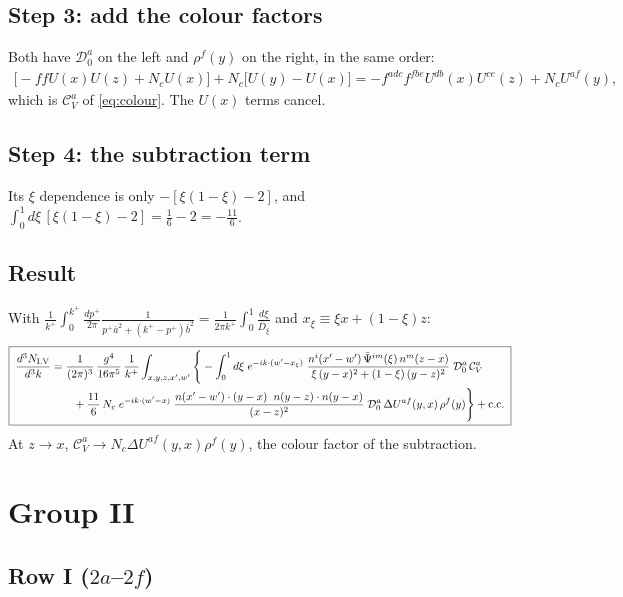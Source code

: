 \documentclass[10pt]{article}
\numberwithin{equation}{section}
\begin{document}
\subsection{Step 3: add the colour factors}
Both have $\mathcal{D}_{0}^{a}$ on the left and $\rho^{f}(y)$ on the right, in the same order:
\begin{align}
\big[-ffU(x)U(z)+N_{c}U(x)\big]+N_{c}\big[U(y)-U(x)\big]=-f^{adc}f^{fbe}U^{db}(x)U^{ce}(z)+N_{c}U^{af}(y),
\end{align}
which is $\mathcal{C}_{V}^{a}$ of \eqref{eq:colour}. The $U(x)$ terms cancel.

\subsection{Step 4: the subtraction term}
Its $\xi$ dependence is only $-[\xi(1-\xi)-2]$, and $\int_{0}^{1}d\xi\,[\xi(1-\xi)-2]=\tfrac16-2=-\tfrac{11}{6}$.

\subsection{Result}
With $\frac{1}{k^{+}}\int_{0}^{k^{+}}\frac{dp^{+}}{2\pi}\frac{1}{p^{+}\bar a^{2}+(k^{+}-p^{+})\bar b^{2}}=\frac{1}{2\pi k^{+}}\int_{0}^{1}\frac{d\xi}{\bar D_{\xi}}$ and $x_{\xi}\equiv\xi x+(1-\xi)z$:
\begin{align}
\boxed{\;\begin{aligned}
\frac{d^{3}N_{\rm I.V}}{d^{3}k}&=\frac{1}{(2\pi)^{3}}\,\frac{g^{4}}{16\pi^{5}}\,\frac{1}{k^{+}}\int_{x,y,z,x',w'}\Bigg\{-\int_{0}^{1}d\xi\;e^{-ik\cdot(w'-x_{\xi})}\;\frac{n^{i}(x'-w')\,\bar\Psi^{im}(\xi)\,n^{m}(z-x)}{\xi\,(y-x)^{2}+(1-\xi)\,(y-z)^{2}}\;\mathcal{D}_{0}^{a}\,\mathcal{C}_{V}^{a}\\
&\qquad+\frac{11}{6}\,N_{c}\;e^{-ik\cdot(w'-x)}\;\frac{n(x'-w')\cdot(y-x)\;\;n(y-z)\cdot n(y-x)}{(x-z)^{2}}\;\mathcal{D}_{0}^{a}\,\Delta U^{af}(y,x)\,\rho^{f}(y)\Bigg\}+{\rm c.c.}
\end{aligned}\;} \label{eq:RowV}
\end{align}
At $z\to x$, $\mathcal{C}_{V}^{a}\to N_{c}\Delta U^{af}(y,x)\rho^{f}(y)$, the colour factor of the subtraction.

\section{Group II}

\subsection{Row I ($2a$--$2f$)}
\end{document}
